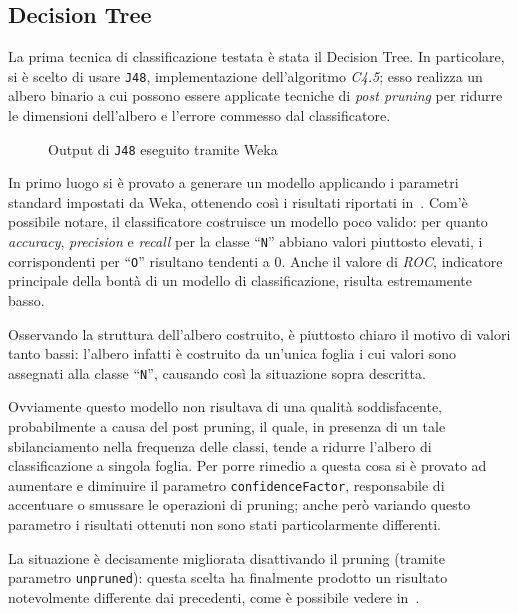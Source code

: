 \subsection{Decision Tree}\label{subsec:tree}

La prima tecnica di classificazione testata è stata il Decision Tree.
In particolare, si è scelto di usare \texttt{J48}, implementazione dell'algoritmo \emph{C4.5};
esso realizza un albero binario a cui possono essere applicate tecniche di \emph{post pruning}
per ridurre le dimensioni dell'albero e l'errore commesso dal classificatore.

\begin{figure}[H]
  \centering
  \caption{Output di \texttt{J48} eseguito tramite Weka}%
  \label{fig:j48}
\end{figure}

In primo luogo si è provato a generare un modello applicando i parametri standard impostati da Weka, ottenendo così i risultati riportati in~.
Com'è possibile notare, il classificatore costruisce un modello poco valido:
per quanto \emph{accuracy}, \emph{precision} e \emph{recall} per la classe ``\texttt{N}'' abbiano valori piuttosto elevati,
i corrispondenti per ``\texttt{O}'' risultano tendenti a \(0\).
Anche il valore di \emph{ROC}, indicatore principale della bontà di un modello di classificazione, risulta estremamente basso.

Osservando la struttura dell'albero costruito, è piuttosto chiaro il motivo di valori tanto bassi:
l'albero infatti è costruito da un'unica foglia i cui valori sono assegnati alla classe ``\texttt{N}'', causando così la situazione sopra descritta.

Ovviamente questo modello non risultava di una qualità soddisfacente, probabilmente a causa del post pruning,
il quale, in presenza di un tale sbilanciamento nella frequenza delle classi, tende a ridurre l'albero di classificazione a singola foglia.
Per porre rimedio a questa cosa si è provato ad aumentare e diminuire il parametro \texttt{confidenceFactor}, responsabile di accentuare o smussare le operazioni di pruning;
anche però variando questo parametro i risultati ottenuti non sono stati particolarmente differenti.

La situazione è decisamente migliorata disattivando il pruning (tramite parametro \texttt{unpruned}):
questa scelta ha finalmente prodotto un risultato notevolmente differente dai precedenti, come è possibile vedere in~.

